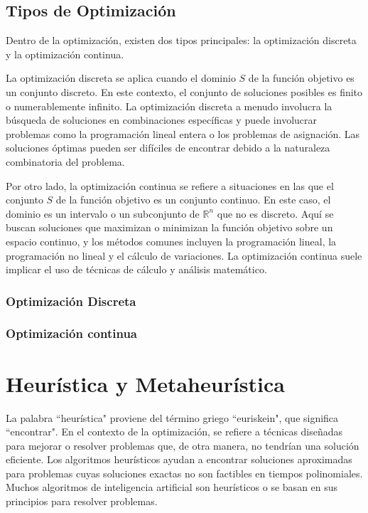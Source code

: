 \documentclass[12pt,titlepage,twoside,openright]{book}
\begin{document}
\subsection{Tipos de Optimizaci\'on}

Dentro de la optimizaci\'on, existen dos tipos principales: la optimizaci\'on discreta y la optimizaci\'on continua.

La optimizaci\'on discreta se aplica cuando el dominio \( S \) de la funci\'on objetivo es un conjunto discreto. En este contexto, el conjunto de soluciones posibles es finito o numerablemente infinito. La optimizaci\'on discreta a menudo involucra la b\'usqueda de soluciones en combinaciones espec\'ificas y puede involucrar problemas como la programaci\'on lineal entera o los problemas de asignaci\'on. Las soluciones \'optimas pueden ser dif\'iciles de encontrar debido a la naturaleza combinatoria del problema.

Por otro lado, la optimizaci\'on continua se refiere a situaciones en las que el conjunto \( S \) de la funci\'on objetivo es un conjunto continuo. En este caso, el dominio es un intervalo o un subconjunto de \( \mathbb{R}^n \) que no es discreto. Aqu\'i se buscan soluciones que maximizan o minimizan la funci\'on objetivo sobre un espacio continuo, y los m\'etodos comunes incluyen la programaci\'on lineal, la programaci\'on no lineal y el c\'alculo de variaciones. La optimizaci\'on continua suele implicar el uso de t\'ecnicas de c\'alculo y an\'alisis matem\'atico.

\subsubsection{Optimizaci\'on Discreta}
\subsubsection{Optimizaci\'on continua}

\section{Heur\'istica y Metaheur\'istica}

La palabra ``heur\'istica" proviene del t\'ermino griego ``euriskein", que significa ``encontrar".
En el contexto de la optimizaci\'on, se refiere a t\'ecnicas dise\~nadas para mejorar o resolver problemas que, de otra manera, no tendr\'ian una soluci\'on eficiente. Los algoritmos heur\'isticos ayudan a encontrar soluciones aproximadas para problemas cuyas soluciones exactas no son factibles en tiempos polinomiales.
Muchos algoritmos de inteligencia artificial son heur\'isticos o se basan en sus principios para resolver problemas.
\end{document}
